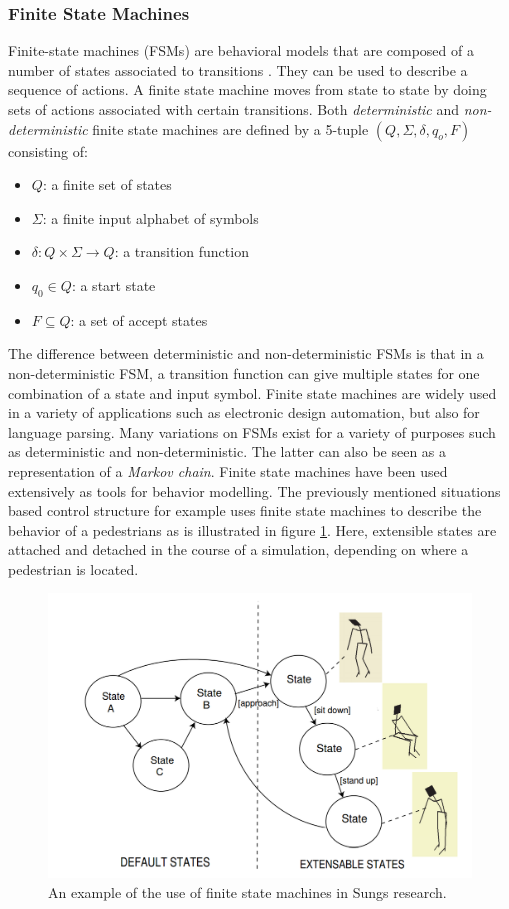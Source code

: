 \documentclass[11pt, a4paper]{book}
\begin{document}
\subsubsection{Finite State Machines}
\label{sec:finitestatemachines}
Finite-state machines (FSMs) are behavioral models that are composed of a number of states associated to transitions \cite{gill1962introduction}. They can be used to describe a sequence of actions. A finite state machine moves from state to state by doing sets of actions associated with certain transitions.
Both \emph{deterministic} and \emph{non-deterministic} finite state machines are defined by a 5-tuple $(Q, \Sigma, \delta, q_o, F)$ consisting of:
\begin{itemize}
\item $Q$: a finite set of states
\item $\Sigma$: a finite input alphabet of symbols
\item $\delta : Q \times \Sigma \rightarrow Q$: a transition function 
\item $q_0 \in Q$: a start state 
\item $F \subseteq Q$: a set of accept states 
\end{itemize}
The difference between deterministic and non-deterministic FSMs is that in a non-deterministic FSM, a transition function can give multiple states for one combination of a state and input symbol.
Finite state machines are widely used in a variety of applications such as electronic design automation, but also for language parsing. Many variations on FSMs exist for a variety of purposes such as deterministic and non-deterministic. The latter can also be seen as a representation of a \emph{Markov chain}. Finite state machines have been used extensively as tools for behavior modelling. The previously mentioned situations based control structure for example uses finite state machines to describe the behavior of a pedestrians as is illustrated in figure \ref{fig:sungstatemachine}. Here, extensible states are attached and detached in the course of a simulation, depending on where a pedestrian is located.
\begin{figure}[h]
\centering
\includegraphics[width=.6\textwidth]{./statemachine_situations.png}
\caption{An example of the use of finite state machines in Sungs research.}
\label{fig:sungstatemachine}
\end{figure}
\end{document}
